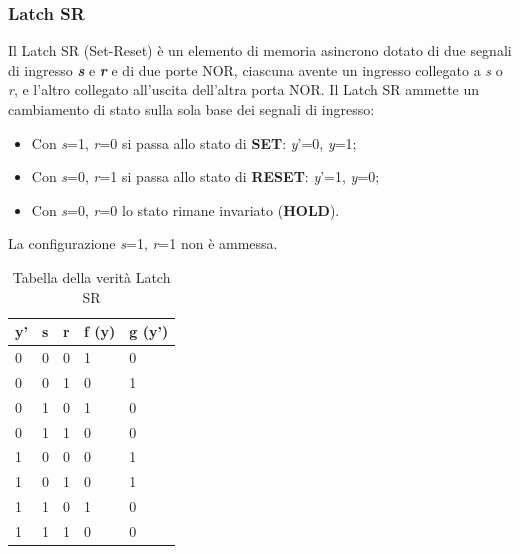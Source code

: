 \documentclass[10pt]{article}
\begin{document}
\begin{itemize}
\subsubsection{Latch SR}
Il Latch SR (Set-Reset) è un elemento di memoria asincrono dotato di due segnali di ingresso \textbf{\emph{s}} e \textbf{\emph{r}} e di due porte NOR, ciascuna avente un ingresso collegato a 
\emph{s} o \emph{r}, e l'altro collegato all'uscita dell'altra porta NOR.
Il Latch SR ammette un cambiamento di stato sulla sola base dei segnali di ingresso:
\begin{itemize}
    \item Con \emph{s}=1, \emph{r}=0 si passa allo stato di \textbf{SET}: \emph{y}'=0, \emph{y}=1;
    \item Con \emph{s}=0, \emph{r}=1 si passa allo stato di \textbf{RESET}: \emph{y}'=1, \emph{y}=0;
    \item Con \emph{s}=0, \emph{r}=0 lo stato rimane invariato (\textbf{HOLD}).
\end{itemize}
La configurazione \emph{s}=1, \emph{r}=1 non è ammessa. 

\begin{table}[H]
    \begin{minipage}[b]{\textwidth}
    \centering
    \begin{tabular}{|lll|ll|}
        \hline
        \textbf{y'} & \textbf{s} & \textbf{r} & \textbf{f (y)} & \textbf{g (y')} \\ \hline
        0           & 0          & 0          & 1              & 0               \\ 
        0           & 0          & 1          & 0              & 1               \\ 
        0           & 1          & 0          & 1              & 0               \\ 
        0           & 1          & 1          & 0              & 0               \\ 
        1           & 0          & 0          & 0              & 1               \\ 
        1           & 0          & 1          & 0              & 1               \\ 
        1           & 1          & 0          & 1              & 0               \\ 
        1           & 1          & 1          & 0              & 0               \\ \hline
        \end{tabular}
        \caption{Tabella della verità Latch SR}
        \label{tab:my-table}
    \end{minipage}
\end{table}


\end{itemize}
\end{document}
